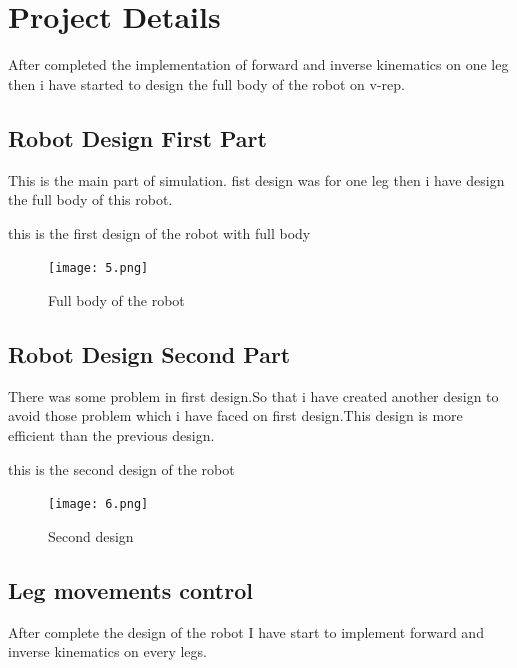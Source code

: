 \documentclass [a4paper ] {report}
\begin{document}
\newpage

\section{Project Details}
After completed the implementation of forward and inverse kinematics on one leg then i have started to design the full body of the robot on v-rep. 

\subsection{Robot Design  First Part}

This is the main part of  simulation.
fist design was for one leg then i have design the full body of this robot. 


\begin{center}

this is the first design of the robot with full body
\vadjust{\vskip 10mm \vskip 0pt}
\begin{figure}[h]
\begin{center}
\texttt{[image: 5.png]}
\end{center}
  \caption{Full body of the robot \vadjust{\vskip 10mm \vskip 0pt}}
\label{fig:fig2}
\end{figure}
\end{center}
\hfill \break

\newpage

\subsection{Robot Design Second Part  }
There was some problem in first design.So that i have created another design to avoid those problem which i have faced on first design.This design is more efficient than the previous design. 


\begin{center}

this is the second design of the robot
\vadjust{\vskip 10mm \vskip 0pt}
\begin{figure}[h]
\begin{center}
\texttt{[image: 6.png]}
\end{center}
  \caption{Second design \vadjust{\vskip 10mm \vskip 0pt}}
\label{fig:fig2}
\end{figure}
\end{center}
\hfill \break
\newpage



\subsection{Leg movements control}
After complete the design of the robot I have start to implement forward and inverse kinematics on every legs.
\end{document}
